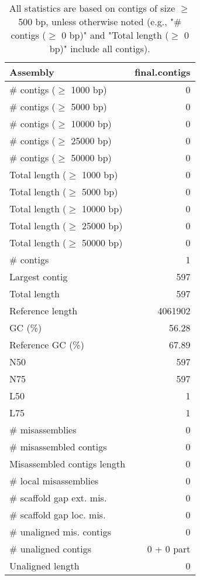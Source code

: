 \documentclass[12pt,a4paper]{article}
\begin{document}
\begin{table}[ht]
\begin{center}
\caption{All statistics are based on contigs of size $\geq$ 500 bp, unless otherwise noted (e.g., "\# contigs ($\geq$ 0 bp)" and "Total length ($\geq$ 0 bp)" include all contigs).}
\begin{tabular}{|l*{1}{|r}|}
\hline
Assembly & final.contigs \\ \hline
\# contigs ($\geq$ 1000 bp) & 0 \\ \hline
\# contigs ($\geq$ 5000 bp) & 0 \\ \hline
\# contigs ($\geq$ 10000 bp) & 0 \\ \hline
\# contigs ($\geq$ 25000 bp) & 0 \\ \hline
\# contigs ($\geq$ 50000 bp) & 0 \\ \hline
Total length ($\geq$ 1000 bp) & 0 \\ \hline
Total length ($\geq$ 5000 bp) & 0 \\ \hline
Total length ($\geq$ 10000 bp) & 0 \\ \hline
Total length ($\geq$ 25000 bp) & 0 \\ \hline
Total length ($\geq$ 50000 bp) & 0 \\ \hline
\# contigs & 1 \\ \hline
Largest contig & 597 \\ \hline
Total length & 597 \\ \hline
Reference length & 4061902 \\ \hline
GC (\%) & 56.28 \\ \hline
Reference GC (\%) & 67.89 \\ \hline
N50 & 597 \\ \hline
N75 & 597 \\ \hline
L50 & 1 \\ \hline
L75 & 1 \\ \hline
\# misassemblies & 0 \\ \hline
\# misassembled contigs & 0 \\ \hline
Misassembled contigs length & 0 \\ \hline
\# local misassemblies & 0 \\ \hline
\# scaffold gap ext. mis. & 0 \\ \hline
\# scaffold gap loc. mis. & 0 \\ \hline
\# unaligned mis. contigs & 0 \\ \hline
\# unaligned contigs & 0 + 0 part \\ \hline
Unaligned length & 0 \\ \hline

\end{tabular}
\end{center}
\end{table}
\end{document}
